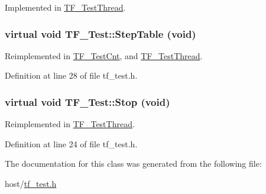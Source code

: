 Implemented in \hyperlink{classTF__TestThread_af7457803ef027ae030d7a98363b9e4b9}{TF\_\-TestThread}.\hypertarget{classTF__Test_ac27a7742873ed7afab48b540fe3d9215}{
\subsubsection[{StepTable}]{\setlength{\rightskip}{0pt plus 5cm}virtual void TF\_\-Test::StepTable (void)}}
\label{classTF__Test_ac27a7742873ed7afab48b540fe3d9215}


Reimplemented in \hyperlink{classTF__TestCnt_ac1a136199115958172e96ef4c9212351}{TF\_\-TestCnt}, and \hyperlink{classTF__TestThread_a25569ec704c682eed81abd63e05adf2a}{TF\_\-TestThread}.

Definition at line 28 of file tf\_\-test.h.\hypertarget{classTF__Test_a710a0463dee6767fcb3a3e3d191978b7}{
\subsubsection[{Stop}]{\setlength{\rightskip}{0pt plus 5cm}virtual void TF\_\-Test::Stop (void)}}
\label{classTF__Test_a710a0463dee6767fcb3a3e3d191978b7}


Reimplemented in \hyperlink{classTF__TestThread_a3a633a8999b704e85bb197b5fdd63b43}{TF\_\-TestThread}.

Definition at line 24 of file tf\_\-test.h.

The documentation for this class was generated from the following file:\begin{DoxyCompactItemize}
\item 
host/\hyperlink{tf__test_8h}{tf\_\-test.h}\end{DoxyCompactItemize}
